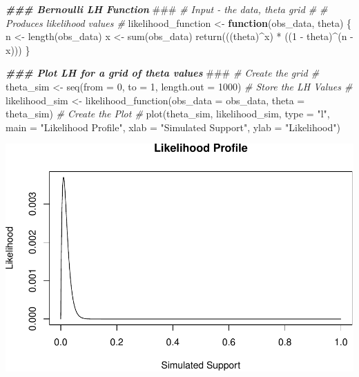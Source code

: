 \documentclass[
]{article}
\newenvironment{Shaded}{\begin{snugshade}}{\end{snugshade}}
\newcommand{\AlertTok}[1]{\textcolor[rgb]{0.94,0.16,0.16}{#1}}
\newcommand{\AttributeTok}[1]{\textcolor[rgb]{0.77,0.63,0.00}{#1}}
\newcommand{\CommentTok}[1]{\textcolor[rgb]{0.56,0.35,0.01}{\textit{#1}}}
\newcommand{\ControlFlowTok}[1]{\textcolor[rgb]{0.13,0.29,0.53}{\textbf{#1}}}
\newcommand{\DecValTok}[1]{\textcolor[rgb]{0.00,0.00,0.81}{#1}}
\newcommand{\DocumentationTok}[1]{\textcolor[rgb]{0.56,0.35,0.01}{\textbf{\textit{#1}}}}
\newcommand{\FunctionTok}[1]{\textcolor[rgb]{0.00,0.00,0.00}{#1}}
\newcommand{\NormalTok}[1]{#1}
\newcommand{\OtherTok}[1]{\textcolor[rgb]{0.56,0.35,0.01}{#1}}
\newcommand{\SpecialCharTok}[1]{\textcolor[rgb]{0.00,0.00,0.00}{#1}}
\newcommand{\StringTok}[1]{\textcolor[rgb]{0.31,0.60,0.02}{#1}}
\begin{document}
\begin{Shaded}
\begin{Highlighting}[]
\DocumentationTok{\#\#\# Bernoulli LH Function }\AlertTok{\#\#\#}
\CommentTok{\# Input {-} the data, theta grid \#}
\CommentTok{\# Produces likelihood values \#}
\NormalTok{likelihood\_function }\OtherTok{\textless{}{-}} \ControlFlowTok{function}\NormalTok{(obs\_data, theta) \{}
\NormalTok{  n }\OtherTok{\textless{}{-}} \FunctionTok{length}\NormalTok{(obs\_data)}
\NormalTok{  x }\OtherTok{\textless{}{-}} \FunctionTok{sum}\NormalTok{(obs\_data)}
  \FunctionTok{return}\NormalTok{(((theta)}\SpecialCharTok{\^{}}\NormalTok{x) }\SpecialCharTok{*}\NormalTok{ ((}\DecValTok{1} \SpecialCharTok{{-}}\NormalTok{ theta)}\SpecialCharTok{\^{}}\NormalTok{(n }\SpecialCharTok{{-}}\NormalTok{ x)))}
\NormalTok{\}}

\DocumentationTok{\#\#\# Plot LH for a grid of theta values }\AlertTok{\#\#\#}
\CommentTok{\# Create the grid \#}
\NormalTok{theta\_sim }\OtherTok{\textless{}{-}} \FunctionTok{seq}\NormalTok{(}\AttributeTok{from =} \DecValTok{0}\NormalTok{, }\AttributeTok{to =} \DecValTok{1}\NormalTok{, }\AttributeTok{length.out =} \DecValTok{1000}\NormalTok{)}
\CommentTok{\# Store the LH Values \#}
\NormalTok{likelihood\_sim }\OtherTok{\textless{}{-}} \FunctionTok{likelihood\_function}\NormalTok{(}\AttributeTok{obs\_data =}\NormalTok{ obs\_data, }\AttributeTok{theta =}\NormalTok{ theta\_sim)}
\CommentTok{\# Create the Plot \#}
\FunctionTok{plot}\NormalTok{(theta\_sim, likelihood\_sim, }\AttributeTok{type =} \StringTok{"l"}\NormalTok{,}
 \AttributeTok{main =} \StringTok{"Likelihood Profile"}\NormalTok{, }\AttributeTok{xlab =} \StringTok{"Simulated Support"}\NormalTok{,}
  \AttributeTok{ylab =} \StringTok{"Likelihood"}\NormalTok{)}
\end{Highlighting}
\end{Shaded}

\includegraphics{lab-02_files/figure-latex/unnamed-chunk-3-1.pdf}
\end{document}

